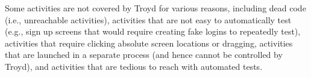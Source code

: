 \documentclass[preprint]{sig-alternate-10pt}
\newcommand{\code}[1]{\textsf{#1}}
\newcommand{\troyd}{Troyd\xspace}
\newcommand{\comment}[3][\color{red}]{}%
\newcommand{\jsjeon}[1]{\comment[\color{red}]{JJ}{#1}}
\begin{document}
Some activities are not
covered by \troyd for various reasons, including 
dead code (i.e., unreachable activities), activities that are not easy to
automatically test (e.g., sign up screens that would require creating fake
logins to repeatedly test), activities that require clicking absolute screen
locations or dragging, activities that are launched in a separate process
(and hence cannot be controlled by \troyd), and activities that are
tedious to reach with automated tests.





\end{document}
